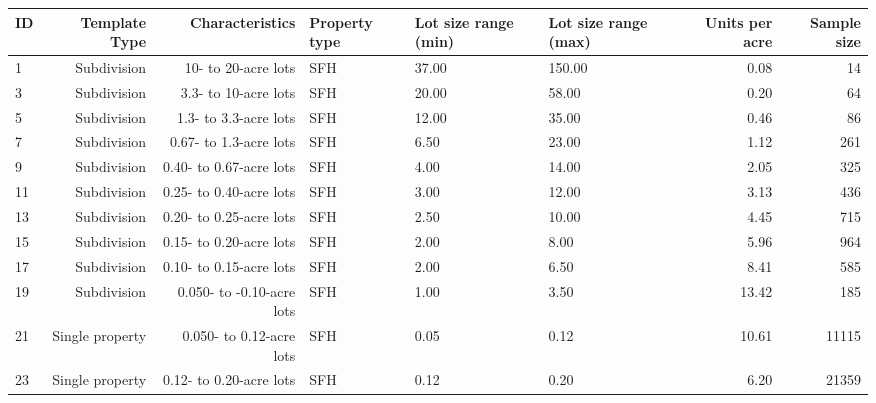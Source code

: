 \begin{tabular}{ p{0.5in} r r p{1in} p{0.75in} p{0.75in} rr}

ID & Template Type & Characteristics & Property type & Lot size range (min) & Lot size range (max) & Units per acre & Sample size \\
\hline
         1 & Subdivision & 10- to 20-acre lots & SFH &      37.00 &     150.00 &       0.08 &         14 \\

         3 & Subdivision & 3.3- to 10-acre lots & SFH &      20.00 &      58.00 &       0.20 &         64 \\

         5 & Subdivision & 1.3- to 3.3-acre lots & SFH &      12.00 &      35.00 &       0.46 &         86 \\

         7 & Subdivision & 0.67- to 1.3-acre lots & SFH &       6.50 &      23.00 &       1.12 &        261 \\

         9 & Subdivision & 0.40- to 0.67-acre lots & SFH &       4.00 &      14.00 &       2.05 &        325 \\

        11 & Subdivision & 0.25- to 0.40-acre lots & SFH &       3.00 &      12.00 &       3.13 &        436 \\

        13 & Subdivision & 0.20- to 0.25-acre lots & SFH &       2.50 &      10.00 &       4.45 &        715 \\

        15 & Subdivision & 0.15- to 0.20-acre lots & SFH &       2.00 &       8.00 &       5.96 &        964 \\

        17 & Subdivision & 0.10- to 0.15-acre lots & SFH &       2.00 &       6.50 &       8.41 &        585 \\

        19 & Subdivision & 0.050- to -0.10-acre lots & SFH &       1.00 &       3.50 &      13.42 &        185 \\

        21 & Single property & 0.050- to 0.12-acre lots & SFH &       0.05 &       0.12 &      10.61 &      11115 \\

        23 & Single property & 0.12- to 0.20-acre lots & SFH &       0.12 &       0.20 &       6.20 &      21359 \\


\end{tabular}
